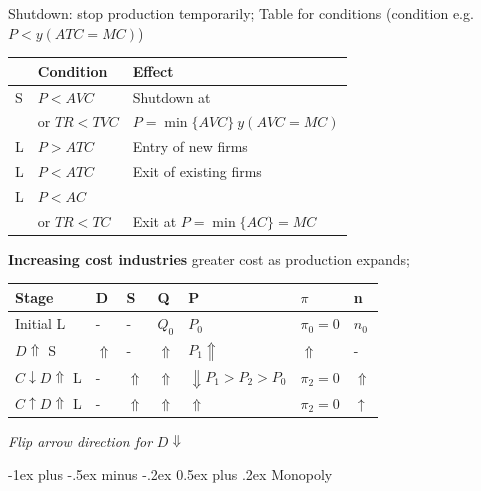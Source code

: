 \documentclass[a4paper]{article}
\makeatletter
\renewcommand{\section}{\@startsection{section}{1}{0mm}%
                                {-1ex plus -.5ex minus -.2ex}%
                                {0.5ex plus .2ex}%
                                {\normalfont\small\bfseries}}
\makeatother
\begin{document}
\begin{multicols*}{3}
        Shutdown: stop production temporarily; Table for conditions (condition e.g. $P < y(ATC=MC)$)

        \begin{tabular}{|l|l|l|}
            \hline
              & Condition     & Effect                      \\\hline
            S & $P < AVC$     & Shutdown at                 \\
              & or $TR < TVC$ & $P=\min\{AVC\}\ y(AVC=MC)$  \\ \hline
            L & $P > ATC$     & Entry of new firms          \\ \hline
            L & $P < ATC$     & Exit of existing firms      \\ \hline
            L & $P < AC$      &                             \\
              & or $TR < TC$  & Exit at $P=\min\{AC\} = MC$ \\ \hline
        \end{tabular}

        \textbf{Increasing cost industries} greater cost as production expands;

        \begin{tabular}{|l|l|l|l|l|l|l|}
            \hline
            Stage                     & D          & S          & Q          & P                            & $\pi$      & n          \\\hline
            Initial L                 & -          & -          & $Q_0$      & $P_0$                        & $\pi_0=0$  & $n_0$      \\
            $D\Uparrow$ S             & $\Uparrow$ & -          & $\Uparrow$ & $P_1 \Uparrow$               & $\Uparrow$ & -          \\
            $C\downarrow D\Uparrow$ L & -          & $\Uparrow$ & $\Uparrow$ & $\Downarrow P_1 > P_2 > P_0$ & $\pi_2=0$  & $\Uparrow$ \\\hline
            $C\uparrow D\Uparrow$ L   & -          & $\Uparrow$ & $\Uparrow$ & $\Uparrow$                   & $\pi_2=0$  & $\uparrow$ \\\hline
        \end{tabular}

        \textit{Flip arrow direction for} $D \Downarrow$

        \section{Monopoly}


\end{multicols*}
\end{document}
